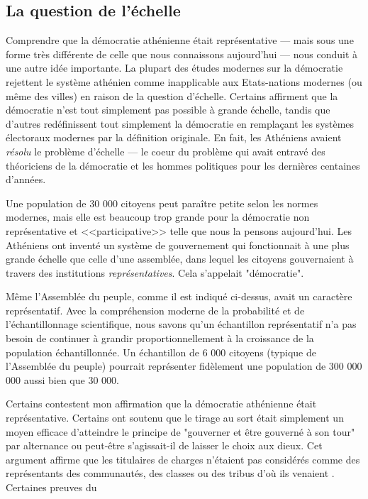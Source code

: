 \subsection{La question de l'échelle}
Comprendre que la démocratie athénienne était représentative --- mais
sous une forme très différente de celle que nous connaissons
aujourd'hui --- nous conduit à une autre idée importante. La plupart des
études modernes sur la démocratie rejettent le système athénien comme
inapplicable aux Etats-nations modernes (ou même des villes) en raison
de la question d'échelle. Certains affirment que la démocratie n'est
tout simplement pas possible à grande échelle, tandis que d'autres redéfinissent
tout simplement  la démocratie en remplaçant les systèmes
électoraux modernes par la définition originale. En fait, les
Athéniens avaient \emph{résolu} le problème d'échelle --- le coeur du
problème qui avait entravé des théoriciens de la démocratie et les
hommes politiques pour les dernières centaines d'années.\par
Une population de 30 000 citoyens peut paraître petite selon les
normes modernes, mais elle est beaucoup trop grande pour la démocratie
non représentative et <<participative>> telle que nous la pensons
aujourd'hui. Les Athéniens ont inventé un système de gouvernement qui
fonctionnait à une plus grande échelle que celle d'une assemblée, dans lequel
les citoyens gouvernaient à travers des institutions
\emph{représentatives}. Cela s'appelait "démocratie".\par
Même l'Assemblée du peuple, comme il est indiqué ci-dessus, avait un
caractère représentatif. Avec la compréhension moderne de la
probabilité et de l'échantillonnage scientifique, nous savons qu'un
échantillon représentatif n'a pas besoin de continuer à grandir
proportionnellement à la croissance de la population
échantillonnée. Un échantillon de 6 000 citoyens (typique de
l'Assemblée du peuple) pourrait représenter fidèlement une population
de 300 000 000 aussi bien que 30 000. \par
Certains contestent mon affirmation que la démocratie athénienne était
représentative. Certains ont soutenu que le tirage au sort était
simplement un moyen efficace d'atteindre le principe de "gouverner
et être gouverné à son tour" par alternance
\cite{manin97} ou peut-être s'agissait-il de laisser le choix aux dieux. Cet
argument affirme que les titulaires de charges n'étaient pas
considérés comme des représentants des communautés, des classes ou des
tribus d'où ils venaient \cite{dowlen08}. Certaines preuves du
